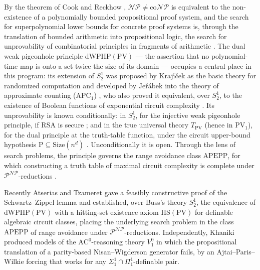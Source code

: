 \documentclass[11pt]{article}
\theoremstyle{definition}
\theoremstyle{remark}
\newcommand{\NP}{\mathscr{N\!P}}
\newcommand{\Vone}{V^0_1}
\begin{document}
By the theorem of Cook and Reckhow \cite{CookReckhow1979}, $\NP\neq\mathrm{co}\NP$
is equivalent to the non-existence of a polynomially bounded propositional proof
system, and the search for superpolynomial lower bounds for concrete proof
systems is, through the translation of bounded arithmetic into propositional
logic, the search for unprovability of combinatorial principles in fragments of
arithmetic \cite{Krajicek1995,Krajicek2019}. The dual weak pigeonhole principle
$\mathrm{dWPHP}(\mathrm{PV})$ --- the assertion that no polynomial-time map is
onto a set twice the size of its domain --- occupies a central place in this
program: its extension of $S^1_2$ was proposed by Kraj\'{\i}\v{c}ek as the basic
theory for randomized computation and developed by Je\v{r}\'abek into the theory
of approximate counting ($\mathrm{APC}_1$) \cite{Jerabek2004,Jerabek2007}, who
also proved it equivalent, over $S^1_2$, to the existence of Boolean functions of
exponential circuit complexity \cite{Jerabek2004}. Its unprovability is known
conditionally: in $S^1_2$, for the injective weak pigeonhole principle, if RSA is
secure \cite{KrajicekPudlak1998}; and in the true universal theory
$T_{\mathrm{PV}}$ (hence in $\mathrm{PV}_1$), for the dual principle at the
truth-table function, under the circuit upper-bound hypothesis
$\mathrm{P}\subseteq\mathrm{Size}(n^d)$ \cite{Krajicek2021}. Unconditionally it
is open. Through the lens of search problems, the principle governs the range
avoidance class $\mathrm{APEPP}$, for which constructing a truth table of
maximal circuit complexity is complete under $\mathscr P^{\NP}$-reductions
\cite{Korten2021}.

Recently Atserias and Tzameret \cite{AtseriasTzameret2025} gave a feasibly
constructive proof of the Schwartz--Zippel lemma and established, over Buss's
theory $S^1_2$, the equivalence of $\mathrm{dWPHP}(\mathrm{PV})$ with a hitting-set
existence axiom $\mathrm{HS}(\mathrm{PV})$ for definable algebraic circuit
classes, placing the underlying search problem in the class $\mathrm{APEPP}$ of
range avoidance under $\mathscr P^{\NP}$-reductions. Independently, Khaniki
\cite{Khaniki2022} produced models of the $\mathrm{AC}^0$-reasoning theory
$\Vone$ in which the propositional translation of a parity-based
Nisan--Wigderson generator fails, by an Ajtai--Paris--Wilkie forcing that works
for any $\Sigma^1_1\cap\Pi^1_1$-definable pair.
\end{document}
